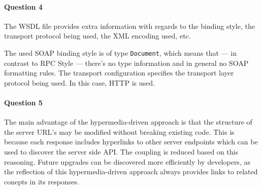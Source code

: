 \documentclass{ds-report}
\begin{document}
	\paragraph{Question 4} The WSDL file provides extra information with regards to the binding style, the transport protocol being used, the XML encoding used, etc. 
	
	The used SOAP binding style is of type \texttt{Document}, which means that --- in contrast to RPC Style --- there's no type information and in general no SOAP formatting rules. The transport configuration specifies the transport layer protocol being used. In this case, HTTP is used. 
	
	\paragraph{Question 5} The main advantage of the hypermedia-driven approach is that the structure of the server URL's may be modified without breaking existing code. This is because each response includes hyperlinks to other server endpoints which can be used to discover the server side API. The coupling is reduced based on this reasoning. Future upgrades can be discovered more efficiently by developers, as the reflection of this hypermedia-driven approach always provides links to related conepts in its responses.
	
	
	\clearpage
	
	
\end{document}
